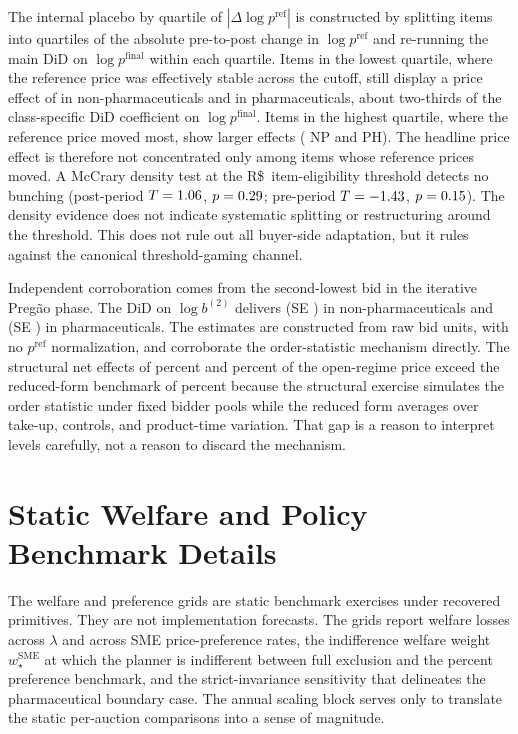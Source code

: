 \documentclass[12pt]{article}
\begin{document}
The internal placebo by quartile of $|\Delta\log p^{\mathrm{ref}}|$ is
constructed by splitting items into quartiles of the absolute pre-to-post
change in $\log p^{\mathrm{ref}}$ and re-running the main DiD on
$\log p^{\mathrm{final}}$ within each quartile. Items in the lowest
quartile, where the reference price was effectively stable across the
cutoff, still display a price effect of \pRefHetQOneNp{} in
non-pharmaceuticals and \pRefHetQOnePh{} in pharmaceuticals, about
two-thirds of the class-specific DiD coefficient on
$\log p^{\mathrm{final}}$. Items in the highest quartile, where the
reference price moved most, show larger effects (\pRefHetQFourNp{} NP and
\pRefHetQFourPh{} PH). The headline price effect is therefore not
concentrated only among items whose reference prices moved. A McCrary density test at the R\$\,\setAsideThreshBRL{}
item-eligibility threshold detects no bunching (post-period
$T=1.06{}$, $p=0.29{}$; pre-period
$T=-1.43{}$, $p=0.15{}$). The density
evidence does not indicate systematic splitting or restructuring around
the threshold. This does not rule out all buyer-side adaptation, but it
rules against the canonical threshold-gaming channel.

Independent corroboration comes from the second-lowest bid in the
iterative Preg\~ao phase. The DiD on $\log b^{(2)}$ delivers
\bidSecondDidEstNp{} (SE \bidSecondDidSeNp{}) in non-pharmaceuticals and
\bidSecondDidEstPh{} (SE \bidSecondDidSePh{}) in pharmaceuticals. The
estimates are constructed from raw bid units, with no
$p^{\mathrm{ref}}$ normalization, and corroborate the order-statistic
mechanism directly. The structural net effects of
\structRatioNp{} percent and \structRatioPh{} percent of the open-regime
price exceed the reduced-form benchmark of \didImpliedRatio{} percent
because the structural exercise simulates the order statistic under fixed
bidder pools while the reduced form averages over take-up, controls, and
product-time variation. That gap is a reason to interpret levels carefully,
not a reason to discard the mechanism.

\section{Static Welfare and Policy Benchmark Details}

The welfare and preference grids are static benchmark exercises under
recovered primitives. They are not implementation forecasts. The grids
report welfare losses across $\lambda$ and across SME price-preference
rates, the indifference welfare weight $w^{\mathrm{SME}}_\star$ at which
the planner is indifferent between full exclusion and the \prefMainPct{}
percent preference benchmark, and the strict-invariance sensitivity that
delineates the pharmaceutical boundary case. The annual scaling block
serves only to translate the static per-auction comparisons into a sense
of magnitude.
\end{document}
